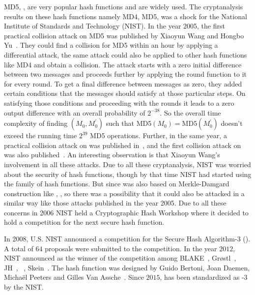 MD5, ,  are very popular hash functions and are widely used. The cryptanalysis results on these hash functions namely MD4, MD5,  was a shock for the National Institute of Standards and Technology (NIST). In the year 2005, the first practical collision attack on MD5 was published by Xiaoyun Wang and Hongbo Yu~\cite{wang2005break}. They could find a collision for MD5 within an hour by applying a differential attack, the same attack could also be applied to other hash functions like MD4 and obtain a collision. The attack starts with a zero initial difference between two messages and proceeds further by applying the round function to it for every round. To get a final difference between messages as zero, they added certain conditions that the messages should satisfy at those particular steps. On satisfying those conditions and proceeding with the rounds it leads to a zero output difference with an overall probability of $2^{-38}$. So the overall time complexity of finding $(M_0, M^\prime_0)$ such that MD5$(M_0) = $MD5$(M^\prime_0)$ doesn't exceed the running time $2^{39}$ MD5 operations. Further, in the same year, a practical collision attack on  was published in~\cite{wang2005efficient}, and the first collision attack on  was also published~\cite{wang2005finding}. An interesting observation is that Xiaoyun Wang's involvement in all these attacks. Due to all these cryptanalysis, NIST was worried about the security of hash functions, though by that time NIST had started using the  family of hash functions. But since  was also based on Merkle-Damgard construction like , , so there was a possibility that it could also be attacked in a similar way like those attacks published in the year 2005. Due to all these concerns in 2006 NIST held a Cryptographic Hash Workshop where it decided to hold a competition for the next secure hash function.

In 2008, U.S. NIST announced a competition for the Secure Hash Algorithm-3 (). A total of $64$ proposals were submitted to the competition. In the year $2012$, NIST announced \KECCAK{} as the winner of the competition among BLAKE~\cite{aumasson2008sha}, Gr\o stl~\cite{gauravaram2011s}, JH~\cite{wu2011hash}, \KECCAK{}~\cite{bertonikeccak}, Skein~\cite{fergusonskein}. The \KECCAK{} hash function was designed by Guido Bertoni, Joan Daemen, Micha\"{e}l Peeters and Gilles Van Assche~\cite{bertoni2009keccak}. Since $2015$, \KECCAK{} has been standardized as \SHA-$3$ by the NIST.


